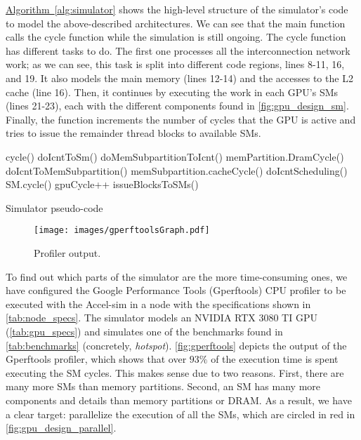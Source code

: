 \par
\hyperref[alg:simulator]{Algorithm~\ref*{alg:simulator}} shows the high-level structure of the simulator's code to model the above-described architectures. We can see that the main function calls the cycle function while the simulation is still ongoing. The cycle function has different tasks to do. The first one processes all the interconnection network work; as we can see, this task is split into different code regions, lines 8-11, 16, and 19. It also models the main memory (lines 12-14) and the accesses to the L2 cache (line 16). Then, it continues by executing the work in each GPU's SMs (lines 21-23), each with the different components found in \autoref{fig:gpu_design_sm}. Finally, the function increments the number of cycles that the GPU is active and tries to issue the remainder thread blocks to available SMs.

\begin{algorithm}
\begin{algorithmic}[1]
        \State cycle()
    \EndWhile
\EndFunction
\State
{}
    \State doIcntToSm()
        \State doMemSubpartitionToIcnt()
    \EndForEach
        \State memPartition.DramCycle()
    \EndForEach
        \State doIcntToMemSubpartition()
        \State memSubpartition.cacheCycle()
    \EndForEach
    \State doIcntScheduling()
    \State
        \State SM.cycle()
    \EndForEach
    \State gpuCycle++
    \State issueBlocksToSMs()
\EndFunction
\end{algorithmic}
\caption{Simulator pseudo-code}\label{alg:simulator}
\end{algorithm}

\begin{figure}[ht]
  \centering
  \texttt{[image: images/gperftoolsGraph.pdf]}
  \caption{Profiler output.}
  \label{fig:gperftools}
\end{figure}

\par
To find out which parts of the simulator are the more time-consuming ones, we have configured the Google Performance Tools (Gperftools) \cite{gperftools} CPU profiler to be executed with the Accel-sim in a node with the specifications shown in \autoref{tab:node_specs}. The simulator models an NVIDIA RTX 3080 TI GPU (\autoref{tab:gpu_specs}) and simulates one of the benchmarks found in \autoref{tab:benchmarks} (concretely, \textit{hotspot}). \autoref{fig:gperftools} depicts the output of the Gperftools profiler, which shows that over $93\%$ of the execution time is spent executing the SM cycles. This makes sense due to two reasons. First, there are many more SMs than memory partitions. Second, an SM has many more components and details than memory partitions or DRAM. As a result, we have a clear target: parallelize the execution of all the SMs, which are circled in red in \autoref{fig:gpu_design_parallel}.

